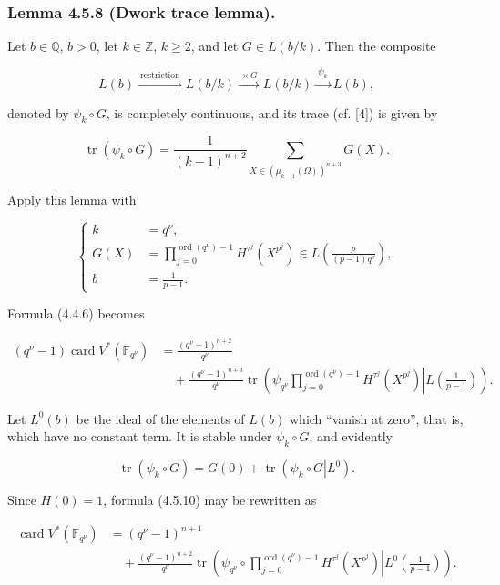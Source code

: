 \subsubsection*{Lemma 4.5.8 (Dwork trace lemma).}
Let $b\in\mathbb Q$, $b>0$, let $k\in\mathbb Z$, $k\geq2$, and let
$G\in L(b/k)$. Then the composite

\[
L(b)\xrightarrow{\ \text{restriction}\ }L(b/k)
\xrightarrow{\ \times G\ }L(b/k)
\xrightarrow{\ \psi_k\ }L(b),
\]

denoted by $\psi_k\circ G$, is completely continuous, and its trace
(cf. [4]) is given by

\begin{equation}\tag{4.5.9}
\operatorname{tr}(\psi_k\circ G)
=\frac1{(k-1)^{n+2}}
\sum_{X\in(\mu_{k-1}(\Omega))^{n+3}}G(X).
\end{equation}

Apply this lemma with

\[
\left\{
\begin{aligned}
k&=q^\nu,\\
G(X)&=\prod_{j=0}^{\operatorname{ord}(q^\nu)-1}
H^{\tau^j}(X^{p^j})
\in L\!\left(\frac{p}{(p-1)q^\nu}\right),\\
b&=\frac1{p-1}.
\end{aligned}
\right.
\]

Formula (4.4.6) becomes

\begin{equation}\tag{4.5.10}
\begin{aligned}
(q^\nu-1)\operatorname{card}V^*(\mathbb F_{q^\nu})
&=\frac{(q^\nu-1)^{n+2}}{q^\nu}\\
&\quad+\frac{(q^\nu-1)^{n+3}}{q^\nu}
\operatorname{tr}\!\left(
\left.\psi_{q^\nu}
\prod_{j=0}^{\operatorname{ord}(q^\nu)-1}H^{\tau^j}(X^{p^j})
\right|L\!\left(\frac1{p-1}\right)\right).
\end{aligned}
\end{equation}

Let $L^0(b)$ be the ideal of the elements of $L(b)$ which ``vanish at
zero'', that is, which have no constant term. It is stable under
$\psi_k\circ G$, and evidently

\begin{equation}\tag{4.5.11}
\operatorname{tr}(\psi_k\circ G)
=G(0)+\operatorname{tr}\!\left(\left.\psi_k\circ G\right|L^0\right).
\end{equation}

Since $H(0)=1$, formula (4.5.10) may be rewritten as

\begin{equation}\tag{4.5.12}
\begin{aligned}
\operatorname{card}V^*(\mathbb F_{q^\nu})
&=(q^\nu-1)^{n+1}\\
&\quad+\frac{(q^\nu-1)^{n+2}}{q^\nu}
\operatorname{tr}\!\left(
\left.\psi_{q^\nu}\circ
\prod_{j=0}^{\operatorname{ord}(q^\nu)-1}H^{\tau^j}(X^{p^j})
\right|L^0\!\left(\frac1{p-1}\right)\right).
\end{aligned}
\end{equation}
